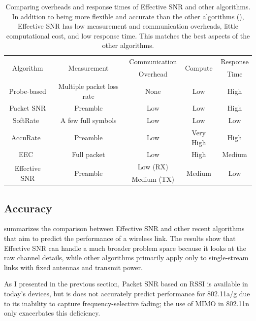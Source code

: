 \begin{table}[p]
\centering
\begin{tabular}{ccccc}
\toprule
\multirow{2}{*}{Algorithm} & \multirow{2}{*}{Measurement} & Communication & \multirow{2}{*}{Compute}  & Response  \\
& & Overhead &  & Time\\
\midrule
Probe-based & Multiple packet loss rate & None & Low & High \\
Packet SNR & Preamble & Low & Low & High \\
SoftRate~\cite{Vutukuru_SoftRate} & A few full symbols & Low & Low & Low \\
AccuRate~\cite{Sen_AccuRate} & Preamble & Low & Very High & High \\
EEC~\cite{Chen_EEC} & Full packet & Low & High & Medium \\
\multirow{2}{*}{Effective SNR} & \multirow{2}{*}{Preamble} & Low (RX) & \multirow{2}{*}{Medium} & \multirow{2}{*}{Low}\\
& & Medium (TX)\\
\bottomrule
\end{tabular}
\caption[Comparison of prediction algorithm overheads and response times]{\label{tab:algorithm_properties}Comparing overheads and response times of Effective SNR and other algorithms. In addition to being more flexible and accurate than the other algorithms (), Effective SNR has low measurement and communication overheads, little computational cost, and low response time. This matches the best aspects of the other algorithms.}
\end{table}


\subsection{Accuracy}
 summarizes the comparison between Effective SNR and other recent algorithms that aim to predict the performance of a wireless link. The results show that Effective SNR can handle a much broader problem space because it looks at the raw channel details, while other algorithms primarily apply only to single-stream links with fixed antennas and transmit power.

As I presented in the previous section, Packet SNR based on RSSI is available in today's devices, but is does not accurately predict performance for 802.11a/g due to its inability to capture frequency-selective fading; the use of MIMO in 802.11n only exacerbates this deficiency.


